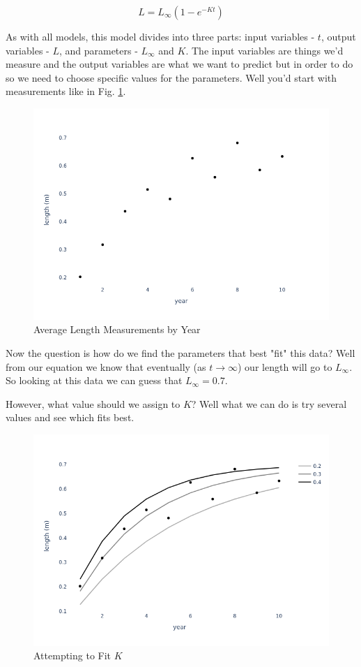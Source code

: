 \documentclass[11pt,a5paper]{book}
\begin{document}
$$L = L_{\infty}(1-e^{-Kt})$$


As with all models, this model divides into three parts: input variables - $t$, output variables - $L$, and parameters - $L_{\infty}$ and $K$. The input variables are things we'd measure and the output variables are what we want to predict but in order to do so we need to choose specific values for the parameters. Well you'd start with measurements like in Fig. \ref{fig:length_measurements_by_year}.


\begin{figure}[H] 
  \includegraphics[scale=0.35]{notebooks/Fitting/new_measurements.png}
  \caption{Average Length Measurements by Year}
  \label{fig:length_measurements_by_year}
\end{figure}

Now the question is how do we find the parameters that best "fit" this data? Well from our equation we know that eventually (as $t \rightarrow \infty$) our length will go to $L_\infty$. So looking at this data we can guess that $L_\infty = 0.7$.  
\newline

However, what value should we assign to $K$? Well what we can do is try several values and see which fits best.

\begin{figure}[H] 
  \includegraphics[width=\linewidth]{notebooks/Fitting/fit_lines.png}
  \caption{Attempting to Fit $K$}
  \label{fig:fitting_K}
\end{figure}
\end{document}
